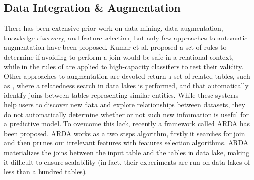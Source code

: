 \subsection{Data Integration \& Augmentation}
There has been extensive prior work on data mining, data augmentation, knowledge discovery, and feature selection, but only few approaches to automatic augmentation have been proposed. Kumar et al. \cite{kumar2016join} proposed a set of rules to determine if avoiding to perform a join would be safe in a relational context, while in \cite{shah2017key} the rules of \cite{kumar2016join} are applied to high-capacity classifiers to test their validity. Other approaches to augmentation are devoted return a set of related tables, such as \cite{bogatu2020dataset}, where a relatedness search in data lakes is performed, and \cite{fernandez2018aurum} that automatically identify joins between tables representing similar entities. While these systems help users to discover new data and explore relationships between datasets, they do not automatically determine whether or not such new information
is useful for a predictive model. To overcome this lack, recently a framework called ARDA \cite{chepurko2020arda} has been proposed. ARDA works as a two steps algorithm, firstly it searches for join and then prunes out irrelevant features with features selection algorithms. ARDA materializes the joins between the input table and the tables in data lake, making it difficult to ensure scalability (in fact, their experiments are run on data lakes of less than a hundred tables).


